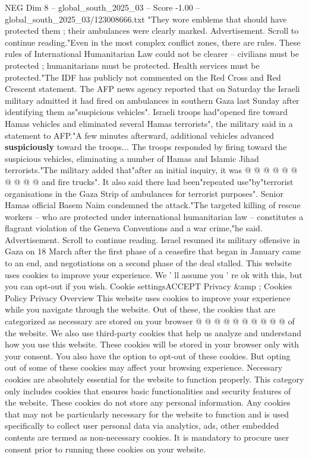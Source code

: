 \begin{textsample}{NEG Dim 8 – global\_south\_2025\_03 – Score -1.00 – global\_south\_2025\_03/123008666.txt}  \label{ex:f8_neg_074}
"They wore emblems that should have protected them ; their ambulances were clearly marked.
Advertisement.
Scroll to continue reading."Even in the most complex conflict zones, there are rules.
These rules of International Humanitarian Law could not be clearer -- civilians must be protected ; humanitarians must be protected.
Health services must be protected."The IDF has publicly not commented on the Red Cross and Red Crescent statement.
The AFP news agency reported that on Saturday the Israeli military admitted it had fired on ambulances in southern Gaza last Sunday after identifying them as"suspicious vehicles".
Israeli troops had"opened fire toward Hamas vehicles and eliminated several Hamas terrorists", the military said in a statement to AFP."A few minutes afterward, additional vehicles advanced \textbf{suspiciously} toward the troops...
The troops responded by firing toward the suspicious vehicles, eliminating a number of Hamas and Islamic Jihad terrorists."The military added that"after an initial inquiry, it was @ @ @ @ @ @ @ @ @ @ and fire trucks".
It also said there had been"repeated use"by"terrorist organisations in the Gaza Strip of ambulances for terrorist purposes".
Senior Hamas official Basem Naim condemned the attack."The targeted killing of rescue workers -- who are protected under international humanitarian law -- constitutes a flagrant violation of the Geneva Conventions and a war crime,"he said.
Advertisement.
Scroll to continue reading.
Israel resumed its military offensive in Gaza on 18 March after the first phase of a ceasefire that began in January came to an end, and negotiations on a second phase of the deal stalled.
This website uses cookies to improve your experience.
We ' ll assume you ' re ok with this, but you can opt-out if you wish.
Cookie settingsACCEPT Privacy \&amp ; Cookies Policy Privacy Overview This website uses cookies to improve your experience while you navigate through the website.
Out of these, the cookies that are categorized as necessary are stored on your browser @ @ @ @ @ @ @ @ @ @ of the website.
We also use third-party cookies that help us analyze and understand how you use this website.
These cookies will be stored in your browser only with your consent.
You also have the option to opt-out of these cookies.
But opting out of some of these cookies may affect your browsing experience.
Necessary cookies are absolutely essential for the website to function properly.
This category only includes cookies that ensures basic functionalities and security features of the website.
These cookies do not store any personal information.
Any cookies that may not be particularly necessary for the website to function and is used specifically to collect user personal data via analytics, ads, other embedded contents are termed as non-necessary cookies.
It is mandatory to procure user consent prior to running these cookies on your website.

\end{textsample}
